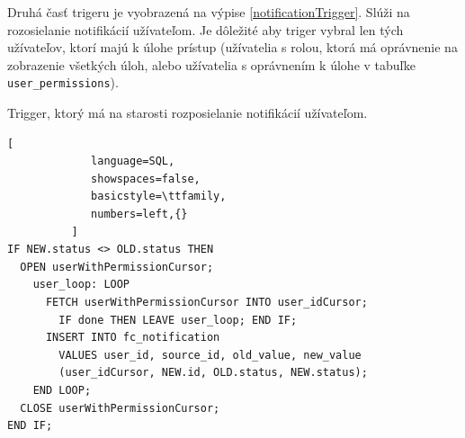 \documentclass[slovak]{fitthesis}
\begin{document}
 Druhá časť trigeru je vyobrazená na výpise \ref{notificationTrigger}. Slúži na rozosielanie notifikácií užívateľom. Je dôležité aby triger vybral len tých užívateľov, ktorí majú k úlohe prístup (užívatelia s rolou, ktorá má oprávnenie na zobrazenie všetkých úloh, alebo užívatelia s oprávnením k úlohe v tabuľke \texttt{user\_permissions}).
\begin{algorithm}[H]
  \caption{Trigger, ktorý má na starosti rozposielanie notifikácií užívateľom.}
  \label{notificationTrigger}
  \begin{lstlisting}[
             language=SQL,
             showspaces=false,
             basicstyle=\ttfamily,
             numbers=left,{}
          ]
IF NEW.status <> OLD.status THEN 
  OPEN userWithPermissionCursor; 
    user_loop: LOOP
      FETCH userWithPermissionCursor INTO user_idCursor;
        IF done THEN LEAVE user_loop; END IF;
      INSERT INTO fc_notification 
        VALUES user_id, source_id, old_value, new_value
        (user_idCursor, NEW.id, OLD.status, NEW.status);
    END LOOP;
  CLOSE userWithPermissionCursor;
END IF;
  \end{lstlisting}
\end{algorithm}
\end{document}
